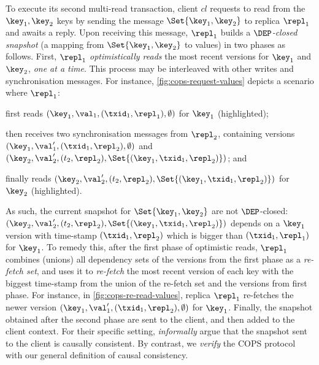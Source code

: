To execute its second multi-read transaction,
client  \( cl \) requests to read from the $\key_1, \key_2$ keys by sending the message 
\( \Set{\key_1, \key_2} \) to replica $\repl_1$ and awaits a reply.
Upon receiving this message, $\repl_1$ builds a \emph{\( \DEP \)-closed snapshot} (a mapping from $\Set{\key_1, \key_2}$ to values) in two phases as follows. 
First, $\repl_1$ \emph{optimistically reads} the most recent versions for $\key_1$ and $\key_2$,
\emph{one at a time}. 
This process may be interleaved with other writes and synchronisation messages. 
For instance, \cref{fig:cops-request-values} depicts a scenario where \( \repl_1 \):
\begin{enumerate*}
	\item first reads \( (\key_1,\val_1,(\txid_1,\repl_1), \emptyset) \) for $\key_1$ (highlighted); %
	\item then receives two synchronisation messages from \( \repl_2 \), 
containing versions \( ( \key_1, \val'_1, (\txid_1,\repl_2),\emptyset ) \) and \( ( \key_2, \val'_2, (t_2,\repl_2),\Set{(\key_1,\txid_1,\repl_2)} ) \); and
	\item finally reads \( ( \key_2, \val'_2, (t_2,\repl_2),\Set{(\key_1,\txid_1,\repl_2)} ) \) for $\key_2$ (highlighted).
\end{enumerate*}
As such, the current snapshot for \( \Set{\key_1,\key_2}\) are not \( \DEP \)-closed: 
\( ( \key_2, \val'_2, (t_2,\repl_2),\Set{(\key_1,\txid_1,\repl_2)} ) \) depends on 
a $\key_1$ version with time-stamp $(\txid_1, \repl_2)$ which is bigger than $(\txid_1, \repl_1)$ for $\key_1$.
To remedy this, after the first phase of optimistic reads,
$\repl_1$ combines (unions) all dependency sets of the versions from the first phase as a \emph{re-fetch set},
and uses it to \emph{re-fetch}
the most recent version of each key with the biggest time-stamp 
from the union of the re-fetch set and the versions from first phase.
For instance, in \cref{fig:cops-re-read-values}, replica $\repl_1$ re-fetches 
the newer version \( ( \key_1, \val'_1, (\txid_1,\repl_2),\emptyset ) \) for \( \key_1 \).
Finally, the snapshot obtained after the second phase 
are sent to the client, and then added to the client context.
For their specific setting, \citet{cops} \emph{informally} argue that the snapshot sent to the client is causally consistent.
By contrast, we \emph{verify} the COPS protocol with our general definition of causal consistency.


